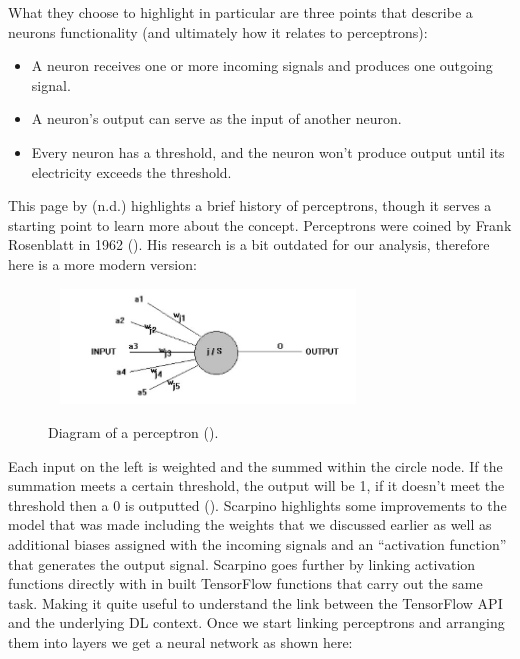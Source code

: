 \documentclass{article}
\begin{document}
What they choose to highlight in particular are three points that describe a neurons functionality (and ultimately how 
it relates to perceptrons):

\begin{itemize}
    \item A neuron receives one or more incoming signals and produces one outgoing signal.
    \item A neuron's output can serve as the input of another neuron.
    \item Every neuron has a threshold, and the neuron won't produce output until its electricity exceeds the threshold.
\end{itemize}

This page by \citeauthor{anonpercep} (n.d.) highlights a brief history of perceptrons, though 
it serves a starting point to learn more about the concept. Perceptrons were coined by Frank Rosenblatt in 1962  
(\cite{rosenblatt1961principles}). His research is a bit outdated for our analysis, therefore here is a 
more modern version:

\begin{figure}[h]\
    \centering
    \includegraphics[width=0.7\textwidth]{perceptron.jpg}
    \caption{Diagram of a perceptron (\cite{anonpercep}).}
\end{figure}

Each input on the left is weighted and the summed within the circle node. If the summation meets a certain threshold, 
the output will be 1, if it doesn't meet the threshold then a 0 is outputted (\cite{ScarpinoMatthew2018Tfd}). 
Scarpino highlights some 
improvements to the model that was made including the weights that we discussed earlier as well as additional biases 
assigned with the incoming signals and an “activation function” that generates the output signal. Scarpino goes further 
by linking activation functions directly with in built TensorFlow functions that carry out the same task. Making it 
quite useful to understand the link between the TensorFlow API and the underlying DL context. Once we start linking 
perceptrons and arranging them into layers we get a neural network as shown here:
\end{document}
